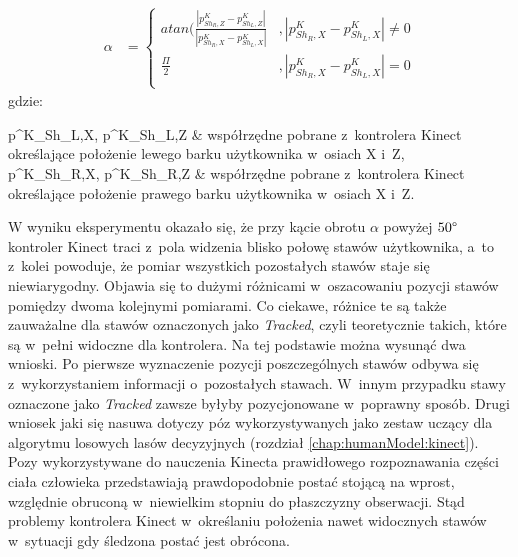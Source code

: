\begin{equation}
	\label{eq:characteristics:kinect:bodyRotationAngle}
	\begin{split}
		\alpha &= 
		\begin{cases} 
			atan(\frac{|p^K_{{Sh}_R,Z} - p^K_{{Sh}_L,Z}|}{|p^K_{{Sh}_R,X} - p^K_{{Sh}_L,X}|} & , |p^K_{{Sh}_R,X} - p^K_{{Sh}_L,X}| \neq 0 \\
			\frac{\Pi}{2}                                                                    & , |p^K_{{Sh}_R,X} - p^K_{{Sh}_L,X}| = 0    \\		
		\end{cases}
	\end{split}
\end{equation}
gdzie:
\begin{conditions}
	p^K_{{Sh}_L,X}, p^K_{{Sh}_L,Z}			& współrzędne pobrane z~kontrolera Kinect określające położenie lewego barku użytkownika w~osiach X i~Z,\\
	p^K_{{Sh}_R,X}, p^K_{{Sh}_R,Z}			& współrzędne pobrane z~kontrolera Kinect określające położenie prawego barku użytkownika w~osiach X i~Z.\\
\end{conditions}
		
		
W wyniku eksperymentu okazało się, że przy kącie obrotu $\alpha$ powyżej $50\degree$ kontroler Kinect traci z~pola widzenia blisko połowę stawów użytkownika, a~to z~kolei powoduje, że pomiar wszystkich pozostałych stawów staje się niewiarygodny. Objawia się to dużymi różnicami w~oszacowaniu pozycji stawów pomiędzy dwoma kolejnymi pomiarami. Co ciekawe, różnice te są także zauważalne dla stawów oznaczonych jako \emph{Tracked}, czyli teoretycznie takich, które są w~pełni widoczne dla kontrolera. Na tej podstawie można wysunąć dwa wnioski. Po pierwsze wyznaczenie pozycji poszczególnych stawów odbywa się z~wykorzystaniem informacji o~pozostałych stawach. W~innym przypadku stawy oznaczone jako \emph{Tracked} zawsze byłyby pozycjonowane w~poprawny sposób. Drugi wniosek jaki się nasuwa dotyczy póz wykorzystywanych jako zestaw uczący dla algorytmu losowych lasów decyzyjnych (rozdział \ref{chap:humanModel:kinect}). Pozy wykorzystywane do nauczenia Kinecta prawidłowego rozpoznawania części ciała człowieka przedstawiają prawdopodobnie postać stojącą na wprost, względnie obruconą w~niewielkim stopniu do płaszczyzny obserwacji. Stąd problemy kontrolera Kinect w~określaniu położenia nawet widocznych stawów w~sytuacji gdy śledzona postać jest obrócona.\\
		
